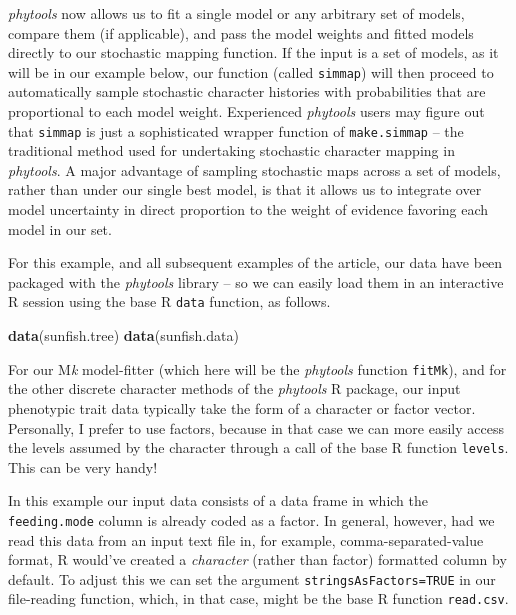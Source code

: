 \documentclass[fleqn,10pt,lineno]{wlpeerj} %
\newenvironment{Shaded}{\begin{snugshade}}{\end{snugshade}}
\newcommand{\FunctionTok}[1]{\textcolor[rgb]{0.13,0.29,0.53}{\textbf{#1}}}
\newcommand{\NormalTok}[1]{#1}
\begin{document}
\emph{phytools} now allows us to fit a single model or any arbitrary set of models, compare them (if applicable), and pass the model weights and fitted models directly to our stochastic mapping function. If the input is a set of models, as it will be in our example below, our function (called \texttt{simmap}) will then proceed to automatically sample stochastic character histories with probabilities that are proportional to each model weight. Experienced \emph{phytools} users may figure out that \texttt{simmap} is just a sophisticated wrapper function of \texttt{make.simmap} -- the traditional method used for undertaking stochastic character mapping in \emph{phytools}. A major advantage of sampling stochastic maps across a set of models, rather than under our single best model, is that it allows us to integrate over model uncertainty in direct proportion to the weight of evidence favoring each model in our set.

For this example, and all subsequent examples of the article, our data have been packaged with the \emph{phytools} library -- so we can easily load them in an interactive R session using the base R \texttt{data} function, as follows.

\begin{Shaded}
\begin{Highlighting}[]
\FunctionTok{data}\NormalTok{(sunfish.tree)}
\FunctionTok{data}\NormalTok{(sunfish.data)}
\end{Highlighting}
\end{Shaded}

For our M\emph{k} model-fitter (which here will be the \emph{phytools} function \texttt{fitMk}), and for the other discrete character methods of the \emph{phytools} R package, our input phenotypic trait data typically take the form of a character or factor vector. Personally, I prefer to use factors, because in that case we can more easily access the levels assumed by the character through a call of the base R function \texttt{levels}. This can be very handy!

In this example our input data consists of a data frame in which the \texttt{feeding.mode} column is already coded as a factor. In general, however, had we read this data from an input text file in, for example, comma-separated-value format, R would've created a \emph{character} (rather than factor) formatted column by default. To adjust this we can set the argument \texttt{stringsAsFactors=TRUE} in our file-reading function, which, in that case, might be the base R function \texttt{read.csv}.
\end{document}
